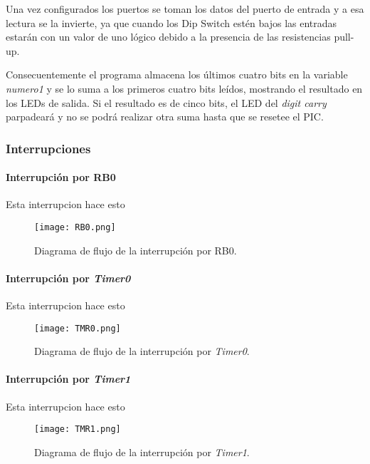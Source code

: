 \documentclass[12pt,a4paper]{article}
\begin{document}
	Una vez configurados los puertos se toman los datos del puerto de entrada y a esa lectura se la invierte, ya que cuando los Dip Switch estén bajos las entradas estarán con un valor de uno lógico debido a la presencia de las resistencias pull-up.
	
	Consecuentemente el programa almacena los últimos cuatro bits en la variable \emph{numero1} y se lo suma a los primeros cuatro bits leídos, mostrando el resultado en los LEDs de salida. Si el resultado es de cinco bits, el LED del \emph{digit carry} parpadeará y no se podrá realizar otra suma hasta que se resetee el PIC.
	
	
	\subsubsection{Interrupciones}

	\paragraph{Interrupción por RB0} Esta interrupcion hace esto
	
	\begin{figure}[H]
	\texttt{[image: RB0.png]}
	\centering
	\caption{Diagrama de flujo de la interrupción por RB0.}
	\end{figure}
	
	\paragraph{Interrupción por \emph{Timer0}} Esta interrupcion hace esto
	
	\begin{figure}[H]
	\texttt{[image: TMR0.png]}
	\centering
	\caption{Diagrama de flujo de la interrupción por \emph{Timer0}.}
	\end{figure}
	
	
	\paragraph{Interrupción por \emph{Timer1}} Esta interrupcion hace esto
	
	\begin{figure}[H]
	\texttt{[image: TMR1.png]}
	\centering
	\caption{Diagrama de flujo de la interrupción por \emph{Timer1}.}
	\end{figure}
	
\end{document}
